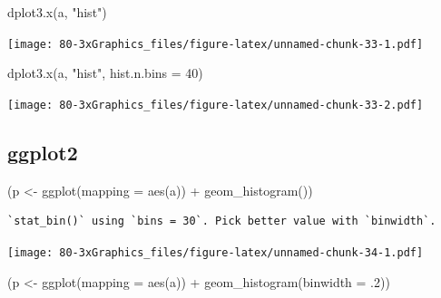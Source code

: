 \documentclass[
]{book}
\newenvironment{Shaded}{\begin{snugshade}}{\end{snugshade}}
\newcommand{\AttributeTok}[1]{\textcolor[rgb]{0.77,0.63,0.00}{#1}}
\newcommand{\DecValTok}[1]{\textcolor[rgb]{0.00,0.00,0.81}{#1}}
\newcommand{\FunctionTok}[1]{\textcolor[rgb]{0.00,0.00,0.00}{#1}}
\newcommand{\NormalTok}[1]{#1}
\newcommand{\OtherTok}[1]{\textcolor[rgb]{0.56,0.35,0.01}{#1}}
\newcommand{\SpecialCharTok}[1]{\textcolor[rgb]{0.00,0.00,0.00}{#1}}
\newcommand{\StringTok}[1]{\textcolor[rgb]{0.31,0.60,0.02}{#1}}
\begin{document}
\begin{Shaded}
\begin{Highlighting}[]
\FunctionTok{dplot3.x}\NormalTok{(a, }\StringTok{"hist"}\NormalTok{)}
\end{Highlighting}
\end{Shaded}

\texttt{[image: 80-3xGraphics\_files/figure-latex/unnamed-chunk-33-1.pdf]}

\begin{Shaded}
\begin{Highlighting}[]
\FunctionTok{dplot3.x}\NormalTok{(a, }\StringTok{"hist"}\NormalTok{, }\AttributeTok{hist.n.bins =} \DecValTok{40}\NormalTok{)}
\end{Highlighting}
\end{Shaded}

\texttt{[image: 80-3xGraphics\_files/figure-latex/unnamed-chunk-33-2.pdf]}

\hypertarget{ggplot2-4}{%
\subsection{\texorpdfstring{\textbf{ggplot2}}{ggplot2}}\label{ggplot2-4}}

\begin{Shaded}
\begin{Highlighting}[]
\NormalTok{(p }\OtherTok{\textless{}{-}} \FunctionTok{ggplot}\NormalTok{(}\AttributeTok{mapping =} \FunctionTok{aes}\NormalTok{(a)) }\SpecialCharTok{+} \FunctionTok{geom\_histogram}\NormalTok{())}
\end{Highlighting}
\end{Shaded}

\begin{verbatim}
`stat_bin()` using `bins = 30`. Pick better value with `binwidth`.
\end{verbatim}

\texttt{[image: 80-3xGraphics\_files/figure-latex/unnamed-chunk-34-1.pdf]}

\begin{Shaded}
\begin{Highlighting}[]
\NormalTok{(p }\OtherTok{\textless{}{-}} \FunctionTok{ggplot}\NormalTok{(}\AttributeTok{mapping =} \FunctionTok{aes}\NormalTok{(a)) }\SpecialCharTok{+} \FunctionTok{geom\_histogram}\NormalTok{(}\AttributeTok{binwidth =}\NormalTok{ .}\DecValTok{2}\NormalTok{))}
\end{Highlighting}
\end{Shaded}
\end{document}
